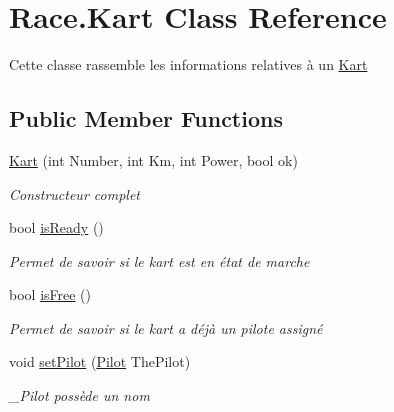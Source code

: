 \hypertarget{class_race_1_1_kart}{}\section{Race.\+Kart Class Reference}
\label{class_race_1_1_kart}


Cette classe rassemble les informations relatives à un \hyperlink{class_race_1_1_kart}{Kart}  


\subsection*{Public Member Functions}
\begin{DoxyCompactItemize}
\item 
\hyperlink{class_race_1_1_kart_aa6be2409a32a5c0a15e75a80af1f51f5}{Kart} (int Number, int Km, int Power, bool ok)
\begin{DoxyCompactList}\small\item\em Constructeur complet \end{DoxyCompactList}\item 
bool \hyperlink{class_race_1_1_kart_a8084f20ca90e2b3cebd62bbc366a2e16}{is\+Ready} ()
\begin{DoxyCompactList}\small\item\em Permet de savoir si le kart est en état de marche \end{DoxyCompactList}\item 
bool \hyperlink{class_race_1_1_kart_a801c7c92b47359e2e07d325dbffff51e}{is\+Free} ()
\begin{DoxyCompactList}\small\item\em Permet de savoir si le kart a déjà un pilote assigné \end{DoxyCompactList}\item 
void \hyperlink{class_race_1_1_kart_aa93fe1b66fba15791abcefaf80efbc30}{set\+Pilot} (\hyperlink{class_race_1_1_pilot}{Pilot} The\+Pilot)
\begin{DoxyCompactList}\small\item\em \+\_\+\+Pilot possède un nom \end{DoxyCompactList}\end{DoxyCompactItemize}
